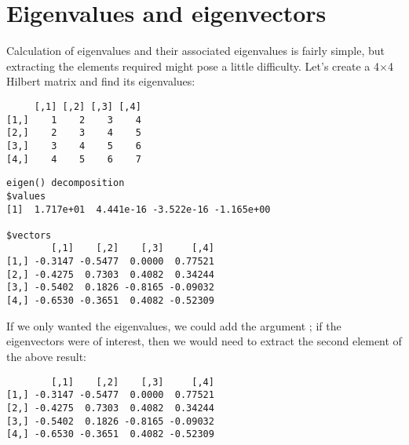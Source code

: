 \section{Eigenvalues and eigenvectors} 
 
Calculation of eigenvalues and their associated eigenvalues is fairly simple, but extracting the elements required might pose a little difficulty. 
 Let's create a 4$\times$4 Hilbert matrix and find its eigenvalues: 
\begin{knitrout}
\color{fgcolor}\begin{kframe}
\begin{alltt}
\hlstd{> }\hlkwb{=}\hlstd{(}\hlopt{-}\hlstd{,}\hlstd{=}\hlstd{,} \hlstd{=}\hlstd{)}
\hlstd{> }\hlkwb{=}\hlopt{+}\hlopt{+}
\hlstd{> }
\end{alltt}
\begin{verbatim}
     [,1] [,2] [,3] [,4]
[1,]    1    2    3    4
[2,]    2    3    4    5
[3,]    3    4    5    6
[4,]    4    5    6    7
\end{verbatim}
\begin{alltt}
\hlstd{> }
\end{alltt}
\begin{verbatim}
eigen() decomposition
$values
[1]  1.717e+01  4.441e-16 -3.522e-16 -1.165e+00

$vectors
        [,1]    [,2]    [,3]     [,4]
[1,] -0.3147 -0.5477  0.0000  0.77521
[2,] -0.4275  0.7303  0.4082  0.34244
[3,] -0.5402  0.1826 -0.8165 -0.09032
[4,] -0.6530 -0.3651  0.4082 -0.52309
\end{verbatim}
\end{kframe}
\end{knitrout}
If we only wanted the eigenvalues, we could add the argument ; if the eigenvectors were of interest, then we would need to extract the second element of the above result: 
\begin{knitrout}
\color{fgcolor}\begin{kframe}
\begin{alltt}
\hlstd{> }\hlopt{$}
\end{alltt}
\begin{verbatim}
        [,1]    [,2]    [,3]     [,4]
[1,] -0.3147 -0.5477  0.0000  0.77521
[2,] -0.4275  0.7303  0.4082  0.34244
[3,] -0.5402  0.1826 -0.8165 -0.09032
[4,] -0.6530 -0.3651  0.4082 -0.52309
\end{verbatim}
\end{kframe}
\end{knitrout}


